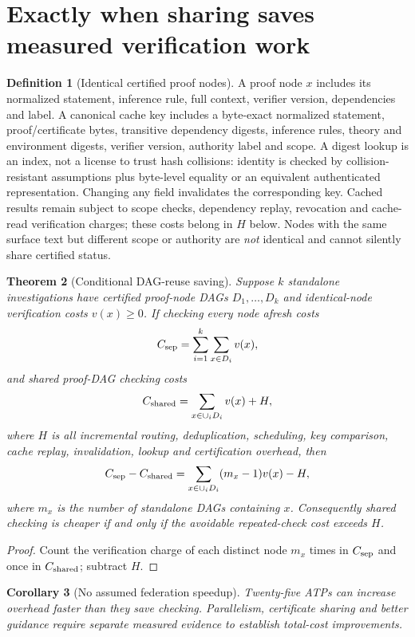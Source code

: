 \documentclass[11pt,letterpaper,oneside]{book}
\newtheorem{theorem}{Theorem}[chapter]
\newtheorem{corollary}[theorem]{Corollary}
\theoremstyle{definition}
\newtheorem{definition}[theorem]{Definition}
\theoremstyle{remark}
\begin{document}
\section{Exactly when sharing saves measured verification work}
\begin{definition}[Identical certified proof nodes]
A proof node $x$ includes its normalized statement, inference rule,
full context, verifier version, dependencies and label. A canonical cache key includes a byte-exact normalized statement,
proof/certificate bytes, transitive dependency digests, inference
rules, theory and environment digests, verifier version, authority
label and scope. A digest lookup is an index, not a license to trust
hash collisions: identity is checked by collision-resistant assumptions
plus byte-level equality or an equivalent authenticated representation.
Changing any field invalidates the corresponding key. Cached results
remain subject to scope checks, dependency replay, revocation and
cache-read verification charges; these costs belong in $H$ below.
Nodes with the same surface text but different scope or authority are
\emph{not} identical and cannot silently share certified status.
\end{definition}
\begin{theorem}[Conditional DAG-reuse saving]\label{thm:reuse}
Suppose $k$ standalone investigations have certified proof-node DAGs
$D_1,\ldots,D_k$ and identical-node verification costs
$v(x)\ge0$. If checking every node afresh costs
\[
 C_{\rm sep}=\sum_{i=1}^k\sum_{x\in D_i}v(x),
\]
and shared proof-DAG checking costs
\[
 C_{\rm shared}=\sum_{x\in\cup_i D_i}v(x)+H,
\]
where $H$ is all incremental routing, deduplication, scheduling,
key comparison, cache replay, invalidation, lookup and certification overhead, then
\[
 C_{\rm sep}-C_{\rm shared}
 =\sum_{x\in\cup_iD_i}(m_x-1)v(x)-H,
\]
where $m_x$ is the number of standalone DAGs containing $x$.
Consequently shared checking is cheaper \emph{if and only if} the
avoidable repeated-check cost exceeds $H$.
\end{theorem}
\begin{proof}
Count the verification charge of each distinct node $m_x$ times
in $C_{\rm sep}$ and once in $C_{\rm shared}$; subtract $H$.\end{proof}
\begin{corollary}[No assumed federation speedup]
Twenty-five ATPs can increase overhead faster than they save checking.
Parallelism, certificate sharing and better guidance require separate
measured evidence to establish total-cost improvements.\end{corollary}
\end{document}
